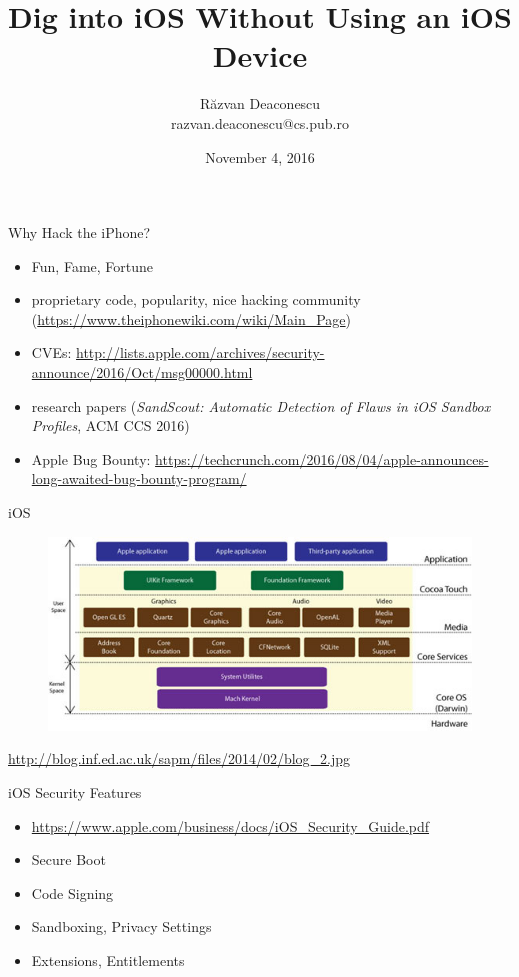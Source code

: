 \documentclass{simple}
\title[Dig into iOS]{Dig into iOS Without Using an iOS Device}
\institute{PR204/ED217 Escape}
\author[Răzvan Deaconescu]{Răzvan Deaconescu \\
razvan.deaconescu@cs.pub.ro}
\date{November 4, 2016}
\begin{document}
\frame{\titlepage}

\begin{frame}{Why Hack the iPhone?}
  \begin{itemize}
    \pause \item Fun, Fame, Fortune
    \pause \item proprietary code, popularity, nice hacking community (\url{https://www.theiphonewiki.com/wiki/Main_Page})
    \pause \item CVEs: \url{http://lists.apple.com/archives/security-announce/2016/Oct/msg00000.html}
    \pause \item research papers (\textit{SandScout: Automatic Detection of Flaws in iOS Sandbox Profiles}, ACM CCS 2016)
    \pause \item Apple Bug Bounty: \url{https://techcrunch.com/2016/08/04/apple-announces-long-awaited-bug-bounty-program/}
  \end{itemize}
\end{frame}

\begin{frame}{iOS}
  \begin{figure}
    \centering
    \includegraphics[width=\textwidth]{img/ios-architecture}
  \end{figure}
  \vspace{1cm}
  \centering
  \footnotesize{\url{http://blog.inf.ed.ac.uk/sapm/files/2014/02/blog_2.jpg}}
\end{frame}

\begin{frame}{iOS Security Features}
  \begin{itemize}
    \item \url{https://www.apple.com/business/docs/iOS_Security_Guide.pdf}
    \item Secure Boot
    \item Code Signing
    \item Sandboxing, Privacy Settings
    \item Extensions, Entitlements
  \end{itemize}
\end{frame}
\end{document}
